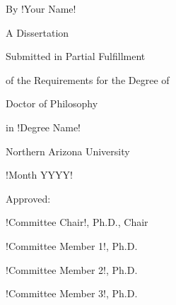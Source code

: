 \begin{centering}
\begin{large}
\begin{spacing}{1.8}

\vspace*{\baselineskip}

\dissertationTitle{}

\thispagestyle{empty} %

\vspace{\baselineskip}

By !Your Name!


A Dissertation

Submitted in Partial Fulfillment

of the Requirements for the Degree of 


Doctor of Philosophy

in !Degree Name!

\vspace{\baselineskip}

Northern Arizona University

!Month YYYY!

\vspace{2\baselineskip}

Approved:

!Committee Chair!, Ph.D., Chair

!Committee Member 1!, Ph.D.

!Committee Member 2!, Ph.D.

!Committee Member 3!, Ph.D.

\end{spacing}
\end{large}
\end{centering}

